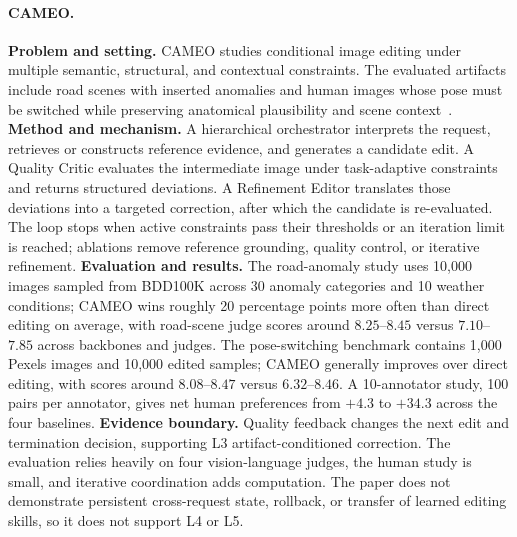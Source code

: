 \paragraph{CAMEO.}
\textbf{Problem and setting.} CAMEO studies conditional image editing under multiple semantic, structural, and contextual constraints. The evaluated artifacts include road scenes with inserted anomalies and human images whose pose must be switched while preserving anatomical plausibility and scene context~\cite{pu2026cameo}. \textbf{Method and mechanism.} A hierarchical orchestrator interprets the request, retrieves or constructs reference evidence, and generates a candidate edit. A Quality Critic evaluates the intermediate image under task-adaptive constraints and returns structured deviations. A Refinement Editor translates those deviations into a targeted correction, after which the candidate is re-evaluated. The loop stops when active constraints pass their thresholds or an iteration limit is reached; ablations remove reference grounding, quality control, or iterative refinement. \textbf{Evaluation and results.} The road-anomaly study uses 10,000 images sampled from BDD100K across 30 anomaly categories and 10 weather conditions; CAMEO wins roughly 20 percentage points more often than direct editing on average, with road-scene judge scores around $8.25$--$8.45$ versus $7.10$--$7.85$ across backbones and judges. The pose-switching benchmark contains 1,000 Pexels images and 10,000 edited samples; CAMEO generally improves over direct editing, with scores around $8.08$--$8.47$ versus $6.32$--$8.46$. A 10-annotator study, 100 pairs per annotator, gives net human preferences from $+4.3$ to $+34.3$ across the four baselines. \textbf{Evidence boundary.} Quality feedback changes the next edit and termination decision, supporting L3 artifact-conditioned correction. The evaluation relies heavily on four vision-language judges, the human study is small, and iterative coordination adds computation. The paper does not demonstrate persistent cross-request state, rollback, or transfer of learned editing skills, so it does not support L4 or L5.

